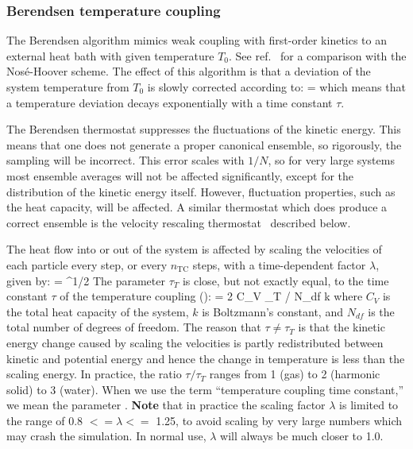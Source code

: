 \documentclass[11pt,a4paper,twoside]{article}
\begin{document}

\subsubsection{Berendsen temperature coupling}
The Berendsen algorithm mimics weak coupling with first-order 
kinetics to an external heat bath with given temperature $T_0$. 
See ref.~\cite{Berendsen91} for a comparison with the
Nos{\'e}-Hoover scheme. The effect of this algorithm is
that a deviation of the system temperature from $T_0$ is slowly
corrected according to:
\beq
{} = 
\label{eqn:Tcoupling}
\eeq
which means that a temperature deviation decays exponentially with a
time constant $\tau$.

The Berendsen thermostat suppresses the fluctuations of the kinetic
energy.  This means that one does not generate a proper canonical
ensemble, so rigorously, the sampling will be incorrect.  This
error scales with $1/N$, so for very large systems most ensemble
averages will not be affected significantly, except for the
distribution of the kinetic energy itself.  However, fluctuation
properties, such as the heat capacity, will be affected.  A similar
thermostat which does produce a correct ensemble is the velocity
rescaling thermostat~\cite{Bussi2007a} described below.

The heat flow into or out of the system is affected by scaling the
velocities of each particle every step, or every $n_\mathrm{TC}$ steps,
with a time-dependent factor $\lambda$, given by:
\beq 
\lambda = ^{1/2}
\label{eqn:lambda}
\eeq
The parameter $\tau_T$ is close, but not exactly equal, to the time constant
$\tau$ of the temperature coupling ():
\beq
\tau = 2 C_V \tau_T / N_{df} k
\eeq
where $C_V$ is the total heat capacity of the system, $k$ is Boltzmann's
constant, and $N_{df}$ is the total number of degrees of freedom. The
reason that $\tau \neq \tau_T$ is that the kinetic energy change
caused by scaling the velocities is partly redistributed between
kinetic and potential energy and hence the change in temperature is
less than the scaling energy.  In practice, the ratio $\tau / \tau_T$
ranges from 1 (gas) to 2 (harmonic solid) to 3 (water). When we use
the term ``temperature coupling time constant,'' we mean the parameter
.  
{\bf Note} that in practice the scaling factor $\lambda$ is limited to 
the range of 0.8 $<= \lambda <=$ 1.25, to avoid scaling by very large
numbers which may crash the simulation. In normal use, 
$\lambda$ will always be much closer to 1.0.
\end{document}

